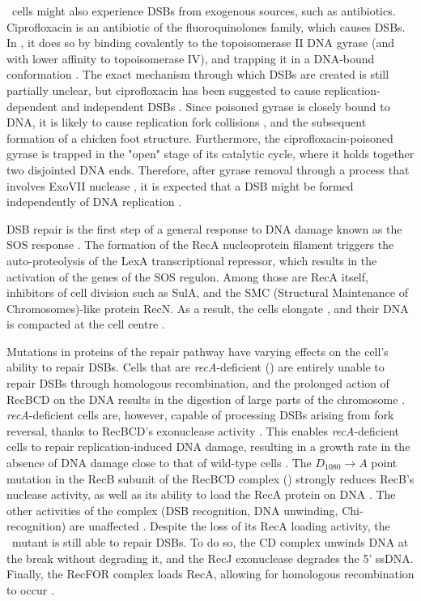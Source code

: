 \ecoli\ cells might also experience DSBs from exo\-genous sources, such as anti\-biotics. Ciprofloxacin is an antibiotic of the fluoro\-quinolones family, which causes DSBs. In \ecoli, it does so by binding covalently to the topoisomerase II DNA gyrase (and with lower affinity to topoisomerase IV), and trapping it in a DNA-bound conformation \cite{Kohanski2010}. The exact mechanism through which DSBs are created is still partially unclear, but ciprofloxacin has been suggested to cause replication-dependent and independent DSBs \cite{Ojkic2020}. Since poisoned gyrase is closely bound to DNA, it is likely to cause replication fork collisions \cite{Wentzell2000, Drlica2008}, and the subsequent formation of a chicken foot structure. Furthermore, the ciprofloxacin-poisoned gyrase is trapped in the "open" stage of its catalytic cycle, where it holds together two disjointed DNA ends. Therefore, after gyrase removal through a process that involves ExoVII nuclease \cite{Huang2021}, it is expected that a DSB might be formed independently of DNA replication \cite{Zhao2006}.

DSB repair is the first step of a general response to DNA damage known as the SOS response \cite{Baharoglu2014}. The formation of the RecA nucleoprotein filament triggers the auto-proteolysis of the LexA transcriptional repressor, which results in the activation of the genes of the SOS regulon. Among those are RecA itself, inhibitors of cell division such as SulA, and the SMC (Structural Maintenance of Chromosomes)-like protein RecN. As a result, the cells elongate \cite{Bos2015}, and their DNA is compacted at the cell centre \cite{Odsbu2014}.

Mutations in proteins of the repair pathway have varying effects on the cell's ability to repair DSBs. Cells that are \emph{recA}-deficient (\dreca) are entirely unable to repair DSBs through homologous recombination, and the prolonged action of RecBCD on the DNA results in the digestion of large parts of the chromosome \cite{Horii1968,Chow2007}. \emph{recA}-deficient cells are, however, capable of processing DSBs arising from fork reversal, thanks to RecBCD's exonuclease activity \cite{Seigneur1998, Michel2001}. This enables \emph{recA}-deficient cells to repair replication-induced DNA damage, resulting in a growth rate in the absence of DNA damage close to that of wild-type cells \cite{delVal2021}. The $D_{1080} \rightarrow A$ point mutation in the RecB subunit of the RecBCD complex (\teneighty) strongly reduces RecB's nuclease activity, as well as its ability to load the RecA protein on DNA \cite{Yu1998, Wang2000}. The other activities of the complex (DSB recognition, DNA unwinding, Chi-recognition) are unaffected \cite{Anderson1999}. Despite the loss of its RecA loading activity, the \geneteneighty\ mutant is still able to repair DSBs. To do so, the \teneighty CD complex unwinds DNA at the break without degrading it, and the RecJ exonuclease degrades the 5' ssDNA. Finally, the RecFOR complex loads RecA, allowing for homologous recombination to occur \cite{Ivancic-Bace_2003}.

